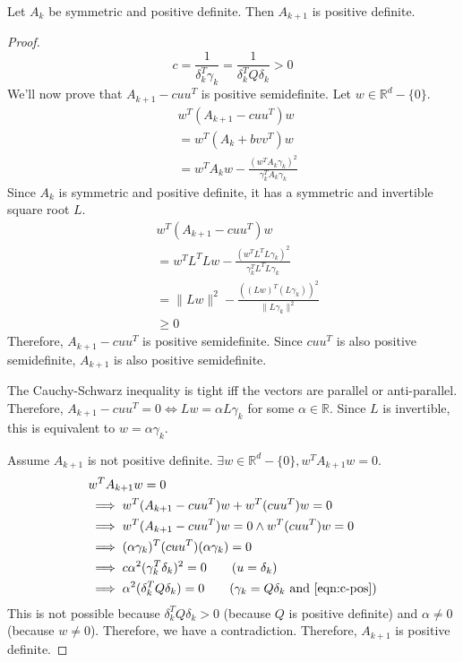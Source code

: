 \begin{theorem} \label{thm:rank-2:pd}
Let $A_k$ be symmetric and positive definite.
Then $A_{k+1}$ is positive definite.
\end{theorem}
\begin{proof}
\begin{equation} \label{eqn:c-pos}
c = \frac{1}{\delta_k^T\gamma_k} = \frac{1}{\delta_k^TQ\delta_k} > 0
\end{equation}
We'll now prove that $A_{k+1} - cuu^T$ is positive semidefinite.
Let $w \in \mathbb{R}^d - \{0\}$.
\begin{align*}
& w^T(A_{k+1} - cuu^T)w
\\ &= w^T(A_k + bvv^T)w
\\ &= w^TA_kw - \frac{(w^TA_k\gamma_k)^2}{\gamma_k^TA_k\gamma_k}
\end{align*}
Since $A_k$ is symmetric and positive definite, it has a symmetric and invertible square root $L$.
\begin{align*}
& w^T(A_{k+1} - cuu^T)w
\\ &= w^TL^TLw - \frac{(w^TL^TL\gamma_k)^2}{\gamma_k^TL^TL\gamma_k}
\\ &= \|Lw\|^2 - \frac{((Lw)^T(L\gamma_k))^2}{\|L\gamma_k\|^2}
\\ &\ge 0 \tag{by Cauchy-Schwarz inequality}
\end{align*}
Therefore, $A_{k+1} - cuu^T$ is positive semidefinite.
Since $cuu^T$ is also positive semidefinite, $A_{k+1}$ is also positive semidefinite.

The Cauchy-Schwarz inequality is tight iff the vectors are parallel or anti-parallel.
Therefore, $A_{k+1} - cuu^T = 0 \iff Lw = \alpha L\gamma_k$ for some $\alpha \in \mathbb{R}$.
Since $L$ is invertible, this is equivalent to $w = \alpha \gamma_k$.

Assume $A_{k+1}$ is not positive definite.
$\exists w \in \mathbb{R}^d - \{0\}, w^TA_{k+1}w = 0$.
\begin{align*}
& w^TA_{k+1}w = 0
\\ &\implies w^T(A_{k+1} - cuu^T)w + w^T(cuu^T)w = 0
\\ &\implies w^T(A_{k+1} - cuu^T)w = 0 \wedge w^T(cuu^T)w = 0
\\ &\implies (\alpha \gamma_k)^T(cuu^T)(\alpha \gamma_k) = 0
\\ &\implies c\alpha^2 (\gamma_k^T\delta_k)^2 = 0 \tag{$u = \delta_k$}
\\ &\implies \alpha^2 (\delta_k^TQ\delta_k) = 0 \tag{$\gamma_k = Q\delta_k$ and \ref{eqn:c-pos}}
\end{align*}
This is not possible because
$\delta_k^TQ\delta_k > 0$ (because $Q$ is positive definite)
and $\alpha \neq 0$ (because $w \neq 0$).
Therefore, we have a contradiction.
Therefore, $A_{k+1}$ is positive definite.
\end{proof}

